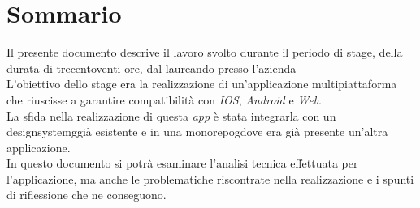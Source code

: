 \cleardoublepage
{}
{}
\begingroup
\let\clearpage\relax
\let\cleardoublepage\relax
\chapter*{Sommario}

Il presente documento descrive il lavoro svolto durante il periodo di stage, della durata di trecentoventi ore, dal laureando \myName presso l'azienda \myAzienda
\\L'obiettivo dello stage era la realizzazione di un'applicazione multipiattaforma che riuscisse a garantire compatibilità con \textit{IOS}, \textit{Android} e \textit{Web}.
\\La sfida nella realizzazione di questa \textit{app} è stata integrarla con un \gls{designsystemg}\glox già esistente e in una \gls{monorepog}\glox dove era già presente un'altra applicazione.
\\In questo documento si potrà esaminare l'analisi tecnica effettuata per l'applicazione, ma anche le problematiche riscontrate nella realizzazione e i spunti di riflessione che ne conseguono.

\endgroup
\vfill
